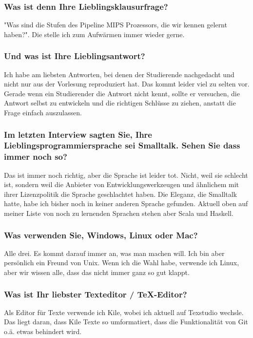 {    \subsubsection{Was ist denn Ihre Lieblingsklausurfrage?}
    "Was sind die Stufen des Pipeline MIPS Prozessors, die wir kennen gelernt haben?". Die stelle ich zum Aufwärmen immer wieder gerne.

    \subsubsection{Und was ist Ihre Lieblingsantwort?}
    Ich habe am liebsten Antworten, bei denen der Studierende nachgedacht und nicht nur aus der Vorlesung reproduziert hat. Das kommt leider viel zu selten vor.
    Gerade wenn ein Studierender die Antwort nicht kennt, sollte er versuchen, die Antwort selbst zu entwickeln und die richtigen Schlüsse zu ziehen, anstatt die Frage einfach auszulassen.

    \subsubsection{Im letzten Interview sagten Sie, Ihre Lieblingsprogrammiersprache sei Smalltalk. Sehen Sie dass immer noch so?}
    Das ist immer noch richtig, aber die Sprache ist leider tot. Nicht, weil sie schlecht ist, sondern weil die Anbieter von Entwicklungswerkzeugen und ähnlichem mit ihrer Lizenzpolitik die Sprache geschlachtet haben. Die Eleganz, die Smalltalk hatte, habe ich bisher noch in keiner anderen Sprache gefunden. Aktuell oben auf meiner Liste von noch zu lernenden Sprachen stehen aber Scala und Haskell.

    \subsubsection{Was verwenden Sie, Windows, Linux oder Mac?}
    Alle drei. Es kommt darauf immer an, was man machen will. Ich bin aber persönlich ein Freund von Unix. Wenn ich die Wahl habe, verwende ich Linux, aber wir wissen alle, dass das nicht immer ganz so gut klappt.

    \subsubsection{Was ist Ihr liebster Texteditor / TeX-Editor?}
    Als Editor für Texte verwende ich Kile,  wobei ich aktuell auf Texstudio wechsle. Das liegt daran, dass Kile Texte so umformatiert, dass die Funktionalität von Git o.ä. etwas behindert wird.

}
